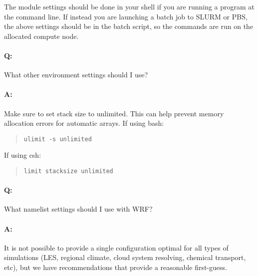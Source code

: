 The module settings should be done in your shell if you are running a program 
at the command line. If instead you are launching a batch job to SLURM or PBS,
the above settings should be in the batch script, so the commands are run on 
the allocated compute node.

\paragraph{Q:} What other environment settings should I use?

\paragraph{A:} Make sure to set stack size to unlimited. This can help 
prevent memory allocation errors for automatic arrays. If using bash:

\begin{quote}
\texttt{ulimit -s unlimited}
\end{quote}

If using csh:

\begin{quote}
\texttt{limit stacksize unlimited}
\end{quote}

\paragraph{Q:} What namelist settings should I use with WRF?

\paragraph{A:} It is not possible to provide a single configuration optimal for
all types of simulations (LES, regional climate, cloud system resolving, 
chemical transport, etc), but we have recommendations that provide a
reasonable first-guess.
\\


